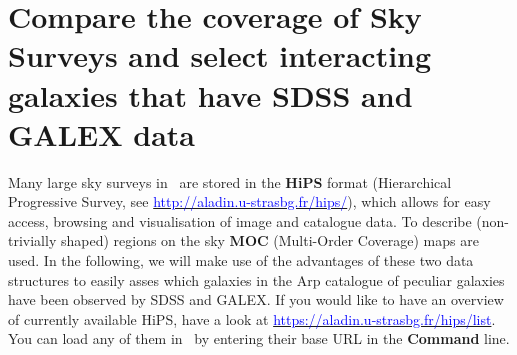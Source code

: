 \documentclass [a4paper, 12pt]{article}
\begin{document}
\section{Compare the coverage of Sky Surveys and select interacting
galaxies that have SDSS and GALEX data}

Many large sky surveys in \aladin\ are stored in the \textbf{HiPS} format
(Hierarchical Progressive Survey, see
\hyperref[http://aladin.u-strasbg.fr/hips/]{\textcolor{blue}
	{http://aladin.u-strasbg.fr/hips/}}),
which allows for easy access, browsing and visualisation of image and catalogue
data. To describe (non-trivially shaped) regions on the sky \textbf{MOC}
(Multi-Order Coverage) maps are used. In the following, we will make use of the
advantages of these two data structures to easily asses which galaxies in the
Arp catalogue of peculiar galaxies have been observed by SDSS and GALEX. If you
would like to have an overview of currently available HiPS, have a look at
\hyperref[https://aladin.u-strasbg.fr/hips/list]{\textcolor{blue}
	{https://aladin.u-strasbg.fr/hips/list}}. You can load any of them in
\aladin\ by entering their base URL in the \textbf{Command} line.
\end{document}
